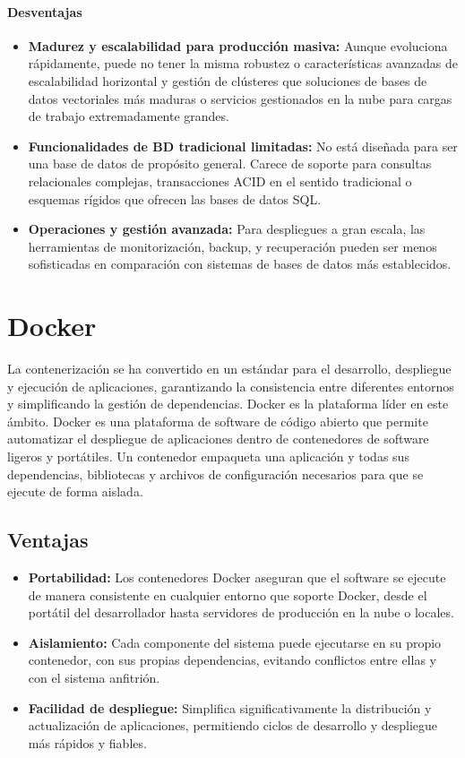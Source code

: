 \paragraph{Desventajas}
\begin{itemize}
    \item \textbf{Madurez y escalabilidad para producción masiva:} Aunque evoluciona rápidamente, puede no tener la misma robustez o características avanzadas de escalabilidad horizontal y gestión de clústeres que soluciones de bases de datos vectoriales más maduras o servicios gestionados en la nube para cargas de trabajo extremadamente grandes.
    \item \textbf{Funcionalidades de BD tradicional limitadas:} No está diseñada para ser una base de datos de propósito general. Carece de soporte para consultas relacionales complejas, transacciones ACID en el sentido tradicional o esquemas rígidos que ofrecen las bases de datos SQL.
    \item \textbf{Operaciones y gestión avanzada:} Para despliegues a gran escala, las herramientas de monitorización, backup, y recuperación pueden ser menos sofisticadas en comparación con sistemas de bases de datos más establecidos.
\end{itemize}

\clearpage
\section{Docker}
La contenerización se ha convertido en un estándar para el desarrollo, despliegue y ejecución de aplicaciones, garantizando la consistencia entre diferentes entornos y simplificando la gestión de dependencias. Docker es la plataforma líder en este ámbito.
Docker es una plataforma de software de código abierto que permite automatizar el despliegue de aplicaciones dentro de contenedores de software ligeros y portátiles. Un contenedor empaqueta una aplicación y todas sus dependencias, bibliotecas y archivos de configuración necesarios para que se ejecute de forma aislada.

\subsection{Ventajas}
\begin{itemize}
\item \textbf{Portabilidad:} Los contenedores Docker aseguran que el software se ejecute de manera consistente en cualquier entorno que soporte Docker, desde el portátil del desarrollador hasta servidores de producción en la nube o locales.
\item \textbf{Aislamiento:} Cada componente del sistema puede ejecutarse en su propio contenedor, con sus propias dependencias, evitando conflictos entre ellas y con el sistema anfitrión.
\item \textbf{Facilidad de despliegue:} Simplifica significativamente la distribución y actualización de aplicaciones, permitiendo ciclos de desarrollo y despliegue más rápidos y fiables.
\end{itemize}

